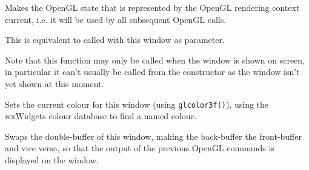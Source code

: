 Makes the OpenGL state that is represented by the OpenGL rendering context
 current, i.e. it will be used by all subsequent OpenGL calls.

This is equivalent to  
called with this window as parameter.

Note that this function may only be called when the window is shown on screen,
in particular it can't usually be called from the constructor as the window
isn't yet shown at this moment.


\label{wxglcanvassetcolour}


Sets the current colour for this window (using \texttt{glcolor3f()}), using the
wxWidgets colour database to find a named colour.


\label{wxglcanvasswapbuffers}


Swaps the double-buffer of this window, making the back-buffer the front-buffer and vice versa,
so that the output of the previous OpenGL commands is displayed on the window.

